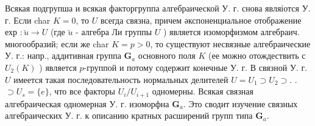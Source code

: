 \documentclass[10pt]{article}
\begin{document}
Всякая подгрупша и всякая факторгруппа алгебраической У. г. снова являіотся У. г. Если char $K=0$, то $U$ всегда связна, причем әкспоненциальное отображение ехр $: \breve{u} \rightarrow U$ (где $\breve{u}$ - алгебра Ли группы $U$ ) является изоморфизмом алгебраич. многообразий; если же char $K=p>0$, то существуют несвязные алгебраические У. г.: напр., аддитивная группа $\mathbf{G}_{a}$ основного поля $K$ (ее можно отождествить с $U_{2}(K)$ ) является $p$-группой и потому содержит конечные У. г. В связной У. г. $U$ имеется такая последовательность нормальных делителей $U=U_{1} \supset U_{2} \supset$. . $\supset U_{s}=\{e\}$, что все факторы $U_{i} / U_{i+1}$ одномерны. Всякая связная алгебраическая одномерная У. г. изоморфна $\mathbf{G}_{a}$. Это сводит изучение связных алгебраических У. г. к описанию кратных расширений групп типа $\mathbf{G}_{a}$.
\end{document}
